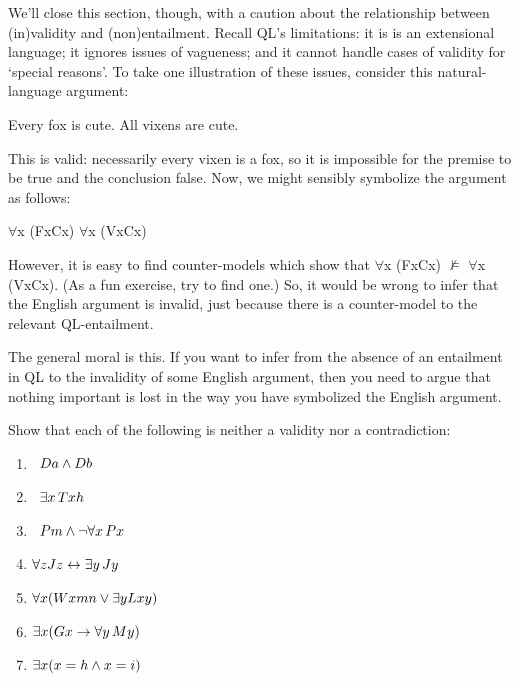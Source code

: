 We’ll close this section, though, with a caution about the relationship between (in)validity and (non)entailment. Recall QL’s limitations: it is is an extensional language; it ignores issues of vagueness; and it cannot handle cases of validity for ‘special reasons’. To take one illustration of these issues, consider this natural-language argument:
\begin{center}
Every fox is cute. \therefore All vixens are cute.
\end{center}
This is valid: necessarily every vixen is a fox, so it is impossible for the premise to be true and the conclusion false. Now, we might sensibly symbolize the argument as follows:
\begin{center}
$\forall$x (Fx\eif Cx) \therefore $\forall$x (Vx\eif Cx)
\end{center}
However, it is easy to find counter-models which show that $\forall$x (Fx\eif Cx) $\nvDash$ $\forall$x (Vx\eif Cx). (As a fun exercise, try to find one.) So, it would be wrong to infer that the English argument is invalid, just because there is a counter-model to the relevant QL-entailment.

The general moral is this. If you want to infer from the absence of an entailment in QL to the invalidity of some English argument, then you need to argue that nothing important is lost in the way you have symbolized the English argument.

\practiceproblems

\problempart
\label{pr.Contingent}
Show that each of the following is neither a validity nor a contradiction:
\begin{enumerate}
\item \leftsolutions\ $\mathord{D}a  \wedge \mathord{D}b$
\item \leftsolutions\ $\exists x\, \mathord{T}xh$
\item \leftsolutions\ $\mathord{P}m  \wedge \neg\forall x\, \mathord{P}x$
\item $\forall z \mathord{J}z \leftrightarrow \exists y\, \mathord{J}y$
\item $\forall x (\mathord{W}xmn \vee \exists y\mathord{L}xy)$
\item $\exists x (\mathord{G}x \rightarrow \forall y\, \mathord{M}y)$
\item $\exists x (x = h \wedge x = i)$
\end{enumerate}

